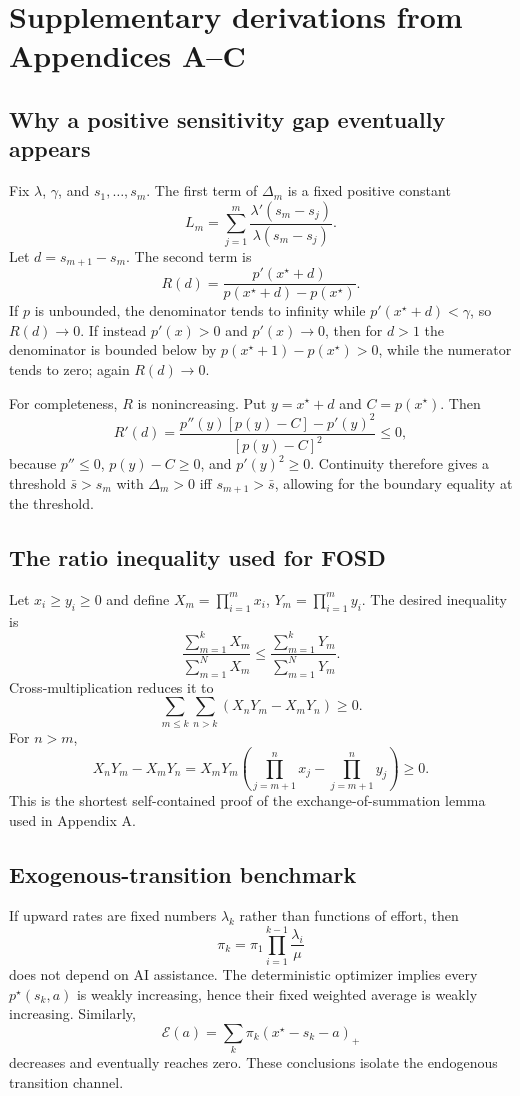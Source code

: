 \documentclass[11pt]{article}
\theoremstyle{tutorial}
\theoremstyle{remark}
\newcommand{\1}{\mathbb{I}}
\newcommand{\pos}[1]{\left(#1\right)_{+}}
\newcommand{\calE}{\mathcal{E}}
\begin{document}
\appendix
\section{Supplementary derivations from Appendices A--C}

\subsection{Why a positive sensitivity gap eventually appears}

Fix $\lambda$, $\gamma$, and $s_1,\ldots,s_m$.  The first term of $\Delta_m$ is a fixed positive constant
\[
L_m=\sum_{j=1}^m\frac{\lambda'(s_m-s_j)}{\lambda(s_m-s_j)}.
\]
Let $d=s_{m+1}-s_m$.  The second term is
\[
R(d)=\frac{p'(x^\star+d)}{p(x^\star+d)-p(x^\star)}.
\]
If $p$ is unbounded, the denominator tends to infinity while $p'(x^\star+d)<\gamma$, so $R(d)\to0$.
If instead $p'(x)>0$ and $p'(x)\to0$, then for $d>1$ the denominator is bounded below by
$p(x^\star+1)-p(x^\star)>0$, while the numerator tends to zero; again $R(d)\to0$.

For completeness, $R$ is nonincreasing.  Put $y=x^\star+d$ and $C=p(x^\star)$.  Then
\[
R'(d)=\frac{p''(y)[p(y)-C]-p'(y)^2}{[p(y)-C]^2}\le0,
\]
because $p''\le0$, $p(y)-C\ge0$, and $p'(y)^2\ge0$.  Continuity therefore gives a threshold
$\bar s>s_m$ with $\Delta_m>0$ iff $s_{m+1}>\bar s$, allowing for the boundary equality at the threshold.

\subsection{The ratio inequality used for FOSD}

Let $x_i\ge y_i\ge0$ and define $X_m=\prod_{i=1}^m x_i$, $Y_m=\prod_{i=1}^m y_i$.  The desired inequality is
\[
\frac{\sum_{m=1}^k X_m}{\sum_{m=1}^N X_m}
\le
\frac{\sum_{m=1}^k Y_m}{\sum_{m=1}^N Y_m}.
\]
Cross-multiplication reduces it to
\[
\sum_{m\le k}\sum_{n>k}(X_nY_m-X_mY_n)\ge0.
\]
For $n>m$,
\[
X_nY_m-X_mY_n
=X_mY_m\left(\prod_{j=m+1}^n x_j-\prod_{j=m+1}^n y_j\right)\ge0.
\]
This is the shortest self-contained proof of the exchange-of-summation lemma used in Appendix A.

\subsection{Exogenous-transition benchmark}

If upward rates are fixed numbers $\lambda_k$ rather than functions of effort, then
\[
\pi_k=\pi_1\prod_{i=1}^{k-1}\frac{\lambda_i}{\mu}
\]
does not depend on AI assistance.  The deterministic optimizer implies every
$p^\star(s_k,a)$ is weakly increasing, hence their fixed weighted average is weakly increasing.  Similarly,
\[
\calE(a)=\sum_k\pi_k\pos{x^\star-s_k-a}
\]
decreases and eventually reaches zero.  These conclusions isolate the endogenous transition channel.
\end{document}
